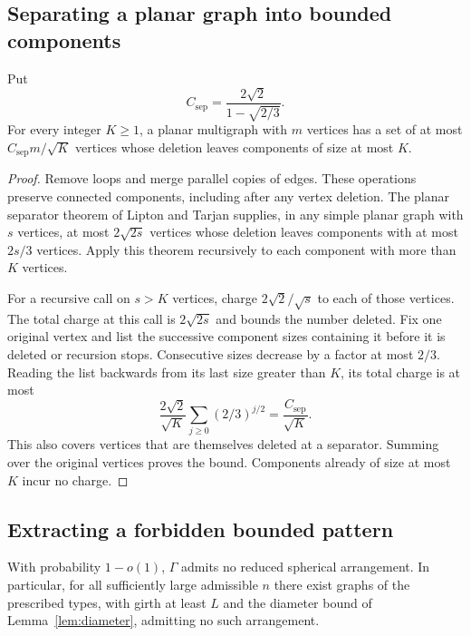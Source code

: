 \subsection{Separating a planar graph into bounded components}

\begin{lemma}
\label{lem:planar-separation}
Put
\[
 C_{\mathrm{sep}}=\frac{2\sqrt2}{1-\sqrt{2/3}}.
\]
For every integer $K\ge1$, a planar multigraph with $m$ vertices has a
set of at most $C_{\mathrm{sep}}m/\sqrt K$ vertices whose deletion leaves components
of size at most $K$.
\end{lemma}

\begin{proof}
Remove loops and merge parallel copies of edges.  These operations
preserve connected components, including after any vertex deletion.
The planar separator theorem of Lipton and Tarjan
\cite[Corollary~2, p.~183]{LiptonTarjan1979} supplies, in any simple planar graph with $s$
vertices, at most $2\sqrt{2s}$ vertices whose deletion leaves components
with at most $2s/3$ vertices.  Apply this theorem recursively to each
component with more than $K$ vertices.

For a recursive call on $s>K$ vertices, charge $2\sqrt2/\sqrt s$ to
each of those vertices.  The total charge at this call is
$2\sqrt{2s}$ and bounds the number deleted.  Fix one original vertex
and list the successive component sizes containing it before it is
deleted or recursion stops.  Consecutive sizes decrease by a factor
at most $2/3$.  Reading the list backwards from its last size greater
than $K$, its total charge is at most
\[
 \frac{2\sqrt2}{\sqrt K}
 \sum_{j\ge0}(2/3)^{j/2}
 =\frac{C_{\mathrm{sep}}}{\sqrt K}.
\]
This also covers vertices that are themselves deleted at a separator.
Summing over the original vertices proves the bound.  Components
already of size at most $K$ incur no charge.
\end{proof}

\subsection{Extracting a forbidden bounded pattern}

\begin{proposition}
\label{prop:no-arrangements}
With probability $1-o(1)$, $\Gamma$ admits no reduced spherical
arrangement.  In particular, for all sufficiently large admissible $n$
there exist graphs of the prescribed types, with girth at least $L$
and the diameter bound of Lemma~\ref{lem:diameter}, admitting no such
arrangement.
\end{proposition}

